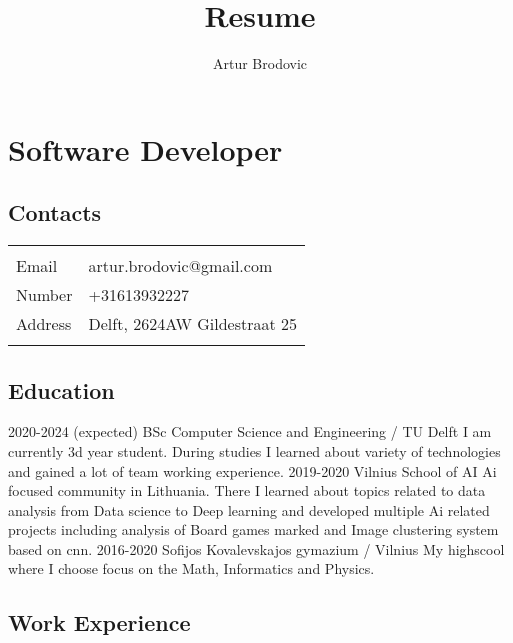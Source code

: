 \documentclass{article}
\begin{document}
\title{Resume}
\author{Artur Brodovic}
\maketitle

\section{Software Developer}
\subsection{Contacts}
\renewcommand{\arraystretch}{1.3}
\vspace{0.5em}
\begin{tabular}{l l}
    \hline \\[-1.0em]
    Email & artur.brodovic@gmail.com \\
    Number & +31613932227 \\
    Address & Delft, 2624AW Gildestraat 25 \\
    \\[-1.0em] \hline 
\end{tabular}
\subsection{Education}
\cvitem
{2020-2024 (expected)}
{BSc Computer Science and Engineering}
{/ TU Delft}
{I am currently 3d year student. During studies I learned about variety of technologies and gained a lot of team working experience.}
\cvitem
{2019-2020}
{Vilnius School of AI}
{}
{Ai focused community in Lithuania. There I learned about topics related to data analysis from Data science to Deep learning and developed multiple Ai related projects including analysis of Board games marked and Image clustering system based on cnn.}
\cvitem
{2016-2020}
{Sofijos Kovalevskajos gymazium}
{/ Vilnius}
{My highscool where I choose focus on the Math, Informatics and Physics.}

\subsection{Work Experience}
\end{document}

